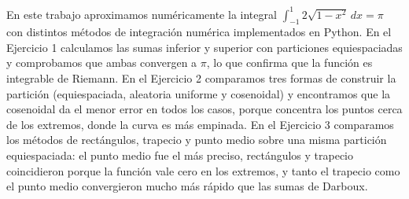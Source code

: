 \documentclass[12pt,a4paper]{article}
\begin{document}
En este trabajo aproximamos numéricamente la integral \(\int_{-1}^{1}2\sqrt{1-x^2}\,dx=\pi\) con distintos métodos de integración numérica implementados en Python. En el Ejercicio 1 calculamos las sumas inferior y superior con particiones equiespaciadas y comprobamos que ambas convergen a \(\pi\), lo que confirma que la función es integrable de Riemann. En el Ejercicio 2 comparamos tres formas de construir la partición (equiespaciada, aleatoria uniforme y cosenoidal) y encontramos que la cosenoidal da el menor error en todos los casos, porque concentra los puntos cerca de los extremos, donde la curva es más empinada. En el Ejercicio 3 comparamos los métodos de rectángulos, trapecio y punto medio sobre una misma partición equiespaciada: el punto medio fue el más preciso, rectángulos y trapecio coincidieron porque la función vale cero en los extremos, y tanto el trapecio como el punto medio convergieron mucho más rápido que las sumas de Darboux.
\clearpage

\tableofcontents

\clearpage




\end{document}
